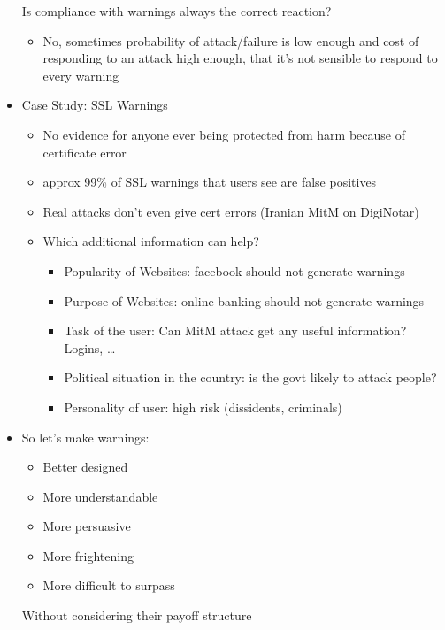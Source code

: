 \documentclass[a4paper,12pt]{scrartcl}
\begin{document}
\begin{itemize}
		Is compliance with warnings always the correct reaction?
		\begin{itemize}
			\item
				No, sometimes probability of attack/failure is low enough and cost of responding to an attack high enough, that it's not sensible to respond to every warning
		\end{itemize}
	\item
		Case Study: SSL Warnings
		\begin{itemize}
			\item
				No evidence for anyone ever being protected from harm because of certificate error
			\item
				approx 99\% of SSL warnings that users see are false positives
			\item
				Real attacks don't even give cert errors (Iranian MitM on DigiNotar)
			\item
				Which additional information can help?
				\begin{itemize}
					\item
						Popularity of Websites: facebook should not generate warnings
					\item
						Purpose of Websites: online banking should not generate warnings
					\item
						Task of the user:
						Can MitM attack get any useful information? Logins, \dots
					\item
						Political situation in the country: is the govt likely to attack people?
					\item
						Personality of user: high risk (dissidents, criminals)
				\end{itemize}
		\end{itemize}
	\item
		So let's make warnings: 
		\begin{itemize}
			\item
				Better designed
			\item
				More understandable
			\item
				More persuasive
			\item
				More frightening
			\item
				More difficult to surpass
		\end{itemize}
		Without considering their payoff structure
		

\end{itemize}
\end{document}
